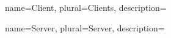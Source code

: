     {
        name=Client,
        plural=Clients,
        description={}
    }

    {
        name=Server,
        plural=Server,
        description={}
    }